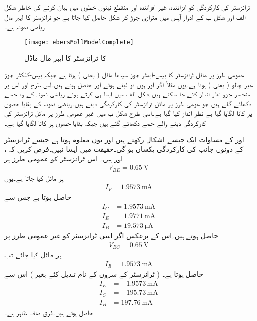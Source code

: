  ٹرانزسٹر کی کارکردگی کو افزائندہ، غیر افزائندہ اور منقطع تینوں خطوں میں بیان کرنے کی خاطر شکل  الف اور شکل  ب  کے ادوار آپس میں متوازی جوڑ کر شکل   حاصل کیا جاتا ہے جو  ٹرانزسٹر کا ایبر-مال ریاضی نمونہ  ہے۔
\begin{figure}
\centering
\texttt{[image: ebersMollModelComplete]}
\caption{ کا ٹرانزسٹر کا ایبر-مال ماڈل}
\label{شکل_مکمل_ایبر_مال_ماڈل}
\end{figure}
عمومی طرز پر مائل ٹرانزسٹر کا بیس-ایمٹر  جوڑ سیدھا مائل ( یعنی ) ہوتا ہے جبکہ بیس-کلکٹر جوڑ غیر چالو ( یعنی ) ہوتا ہے۔یوں مثلاً اگر  اور  ہوں تو   لیتے ہوئے  اور  حاصل ہوتے ہیں۔اس طرح  اور اس پر منحصر جزو نظر انداز کئے جا سکتے ہیں۔شکل  الف میں ایسا ہی کرتے ہوئے ریاضی نمونہ  کے وہ حصے دکھائے گئے ہیں جو عومی طرز پر مائل  ٹرانزسٹر کی کارکردگی دیتے ہیں۔ریاضی نمونہ  کے بقایا حصوں پر کاٹا لگایا گیا ہے نظر انداز کیا گیا ہے۔اسی طرح شکل  ب میں غیر عمومی طرز پر مائل ٹرانزسٹر کی کارکردگی دینے والے حصے دکھائے گئے ہیں جبکہ بقایا حصوں پر کاٹا لگایا گیا ہے۔

اور  کے مساوات ایک جیسے  اشکال رکھتے ہیں اور یوں معلوم ہوتا ہے جیسے ٹرانزسٹر کے دونوں جانب کی کارکردگی یکساں ہو گی۔حقیقت میں ایسا نہیں۔فرض کریں کہ ،  اور  ہیں۔ اس ٹرانزسٹر کو عمومی طرز پر
\begin{align*}
V_{BE}=\SI{0.65}{\volt}
\end{align*}
پر مائل کیا جاتا ہے۔یوں
\begin{align*}
I_F=\SI{1.9573}{\milli \ampere}
\end{align*}
 حاصل ہوتا ہے جس سے
\begin{align*}
I_C &=\SI{1.9573}{\milli \ampere}\\
I_E&=\SI{1.9771}{\milli \ampere}\\
I_B&=\SI{19.573}{\micro \ampere}
\end{align*}
حاصل ہوتے ہیں۔اس کے برعکس اگر اسی ٹرانزسٹر کو غیر عمومی طرز پر
\begin{align*}
V_{BC}=\SI{0.65}{\volt}
\end{align*}
پر مائل کیا جائے تب 
\begin{align*}
I_R=\SI{1.9573}{\milli \ampere}
\end{align*}
حاصل ہوتا ہے۔ ( ٹرانزسٹر کے سروں کے نام تبدیل کئے بغیر ) اس سے
\begin{align*}
I_E&=\SI{-1.9573}{\milli \ampere}\\
I_C&=\SI{-195.73}{\milli \ampere} \\
I_B&=\SI{197.76}{\milli \ampere}
\end{align*}
حاصل ہوتے ہیں۔فرق صاف ظاہر ہے۔

